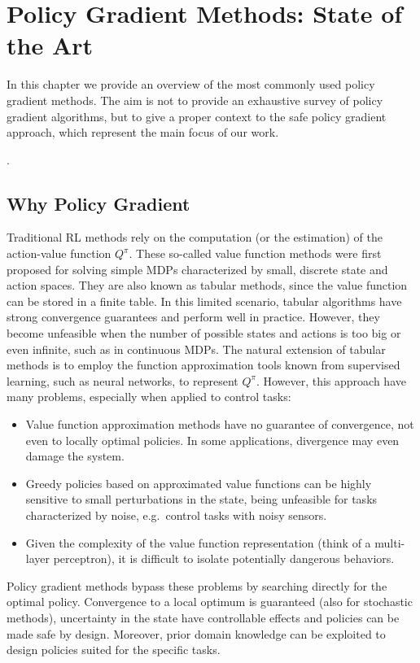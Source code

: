 \chapter{Policy Gradient Methods: State of the Art}

In this chapter we provide an overview of the most commonly used policy gradient methods. The aim is not to provide an exhaustive survey of policy gradient algorithms, but to give a proper context to the safe policy gradient approach, which represent the main focus of our work.

.
\section{Why Policy Gradient}
Traditional \ac{RL} methods rely on the computation (or the estimation) of the action-value function $Q^{\pi}$. These so-called value function methods were first proposed for solving simple \ac{MDP}s characterized by small, discrete state and action spaces. They are also known as tabular methods, since the value function can be stored in a finite table. In this limited scenario, tabular algorithms have strong convergence guarantees and perform well in practice. However, they become unfeasible when the number of possible states and actions is too big or even infinite, such as in continuous \ac{MDP}s.
The natural extension of tabular methods is to employ the function approximation tools known from supervised learning, such as neural networks, to represent $Q^{\pi}$. However, this approach have many problems, especially when applied to control tasks:
\begin{itemize}
\item Value function approximation methods have no guarantee of convergence, not even to locally optimal policies. In some applications, divergence may even damage the system.
\item Greedy policies based on approximated value functions can be highly sensitive to small perturbations in the state, being unfeasible for tasks characterized by noise, e.g.\ control tasks with noisy sensors.
\item Given the complexity of the value function representation (think of a multi-layer perceptron), it is difficult to isolate potentially dangerous behaviors.
\end{itemize}
Policy gradient methods bypass these problems by searching directly for the optimal policy. Convergence to a local optimum is guaranteed (also for stochastic methods), uncertainty in the state have controllable effects and policies can be made safe by design. Moreover, prior domain knowledge can be exploited to design policies suited for the specific tasks.

